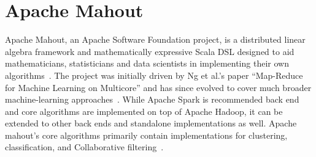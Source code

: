 \section{Apache Mahout}

Apache Mahout, an Apache Software Foundation project, is a distributed linear algebra framework and mathematically expressive Scala DSL designed to aid mathematicians, statisticians and data scientists in implementing their own algorithms~\cite{hid-sp18-510-web-Mahout}. The project was initially driven by Ng et al.'s paper ``Map-Reduce for Machine Learning on Multicore'' and has since evolved to cover much broader machine-learning approaches~\cite{hid-sp18-510-ibm-Mahout}. While Apache Spark is recommended back end and core algorithms are implemented on top of Apache Hadoop, it can be extended to other back ends and standalone implementations as well. Apache mahout’s core algorithms primarily contain implementations for clustering, classification, and Collaborative filtering~\cite{hid-sp18-510-wiki-Mahout}.
